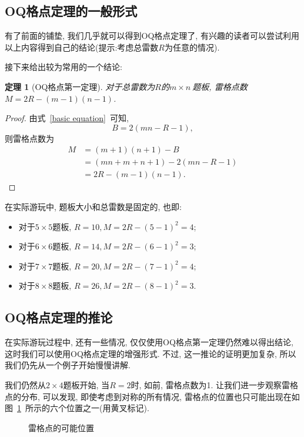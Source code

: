 \documentclass{ctexart}
\newcommand{\varible}[1]{{\Noto[#1]}}
\newcommand{\yellowcross}[2]{
    \begin{scope}[thick,color = yellow,shift={(#1,#2)}]
        \draw (0.05,-0.05) -- (-0.05,0.05);
        \draw (-0.05,-0.05) -- (0.05,0.05);
    \end{scope}
}
\newtheorem{theorem}{定理}
\begin{document}
\subsection{OQ格点定理的一般形式}
有了前面的铺垫, 我们几乎就可以得到OQ格点定理了, 有兴趣的读者可以尝试利用以上内容得到自己的结论(提示:考虑总雷数$R$为任意的情况).

接下来给出较为常用的一个结论:
\begin{theorem}[OQ格点第一定理]
    对于总雷数为$R$的$m\times n\ $\varible{O}\varible{Q}题板, 雷格点数$M = 2R - (m-1)(n-1)$.
\end{theorem}
\begin{proof}
    由式\ \ref{basic equation}\ 可知, 
    $$
    B = 2(mn - R -1),
    $$
    则雷格点数为
    \begin{align*}
        M &= (m+1)(n+1) - B \\
          &= (mn + m + n +1) -2(mn - R -1) \\
          &= 2R - (m-1)(n-1).
    \end{align*}
\end{proof}

在实际游玩中, 题板大小和总雷数是固定的, 也即:
\begin{itemize}
    \item 对于$5\times5$题板, $R = 10, M = 2R - (5-1)^2 = 4$;
    \item 对于$6\times6$题板, $R = 14, M = 2R - (6-1)^2 = 3$;
    \item 对于$7\times7$题板, $R = 20, M = 2R - (7-1)^2 = 4$;
    \item 对于$8\times8$题板, $R = 26, M = 2R - (8-1)^2 = 3$.
\end{itemize}

\subsection{OQ格点定理的推论}
在实际游玩过程中, 还有一些情况, 仅仅使用OQ格点第一定理仍然难以得出结论, 这时我们可以使用OQ格点定理的增强形式. 不过, 这一推论的证明更加复杂, 所以我们仍先从一个例子开始慢慢讲解.

我们仍然从$2\times4$题板开始, 当$R = 2$时, 如前, 雷格点数为1. 让我们进一步观察雷格点的分布, 可以发现, 即使考虑到对称的所有情况, 雷格点的位置也只可能出现在如图\ \ref{example2}\ 所示的六个位置之一(用黄叉标记).
\begin{figure}[ht]
    \centering
    \caption{雷格点的可能位置}
    \label{example2}
\end{figure}
\end{document}
